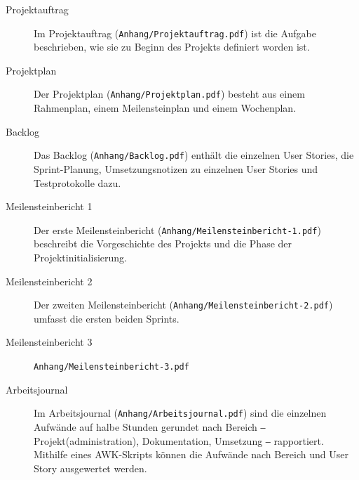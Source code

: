 \begin{description}
    \item[Projektauftrag] Im Projektauftrag (\texttt{Anhang/Projektauftrag.pdf}) ist die Aufgabe beschrieben, wie sie zu Beginn des Projekts definiert worden ist.
    \item[Projektplan] Der Projektplan (\texttt{Anhang/Projektplan.pdf}) besteht aus einem Rahmenplan, einem Meilensteinplan und einem Wochenplan.
    \item[Backlog] Das Backlog (\texttt{Anhang/Backlog.pdf}) enthält die einzelnen User Stories, die Sprint-Planung, Umsetzungsnotizen zu einzelnen User Stories und Testprotokolle dazu. 
    \item[Meilensteinbericht 1] Der erste Meilensteinbericht (\texttt{Anhang/Meilensteinbericht-1.pdf}) beschreibt die Vorgeschichte des Projekts und die Phase der Projektinitialisierung.
    \item[Meilensteinbericht 2] Der zweiten Meilensteinbericht (\texttt{Anhang/Meilensteinbericht-2.pdf}) umfasst die ersten beiden Sprints.
    \item[Meilensteinbericht 3] \texttt{Anhang/Meilensteinbericht-3.pdf}
    \item[Arbeitsjournal] Im Arbeitsjournal (\texttt{Anhang/Arbeitsjournal.pdf}) sind die einzelnen Aufwände auf halbe Stunden gerundet nach Bereich ‒ Projekt(administration), Dokumentation, Umsetzung ‒ rapportiert. Mithilfe eines AWK-Skripts können die Aufwände nach Bereich und User Story ausgewertet werden.
\end{description}
